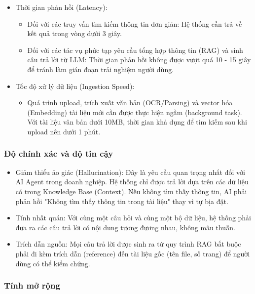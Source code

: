 \begin{itemize}
\item
  Thời gian phản hồi (Latency):

  \begin{itemize}
  \item
    Đối với các truy vấn tìm kiếm thông tin đơn giản: Hệ thống cần trả
    về kết quả trong vòng dưới 3 giây.
  \item
    Đối với các tác vụ phức tạp yêu cầu tổng hợp thông tin (RAG) và sinh
    câu trả lời từ LLM: Thời gian phản hồi không được vượt quá 10 - 15
    giây để tránh làm gián đoạn trải nghiệm người dùng.
  \end{itemize}
\item
  Tốc độ xử lý dữ liệu (Ingestion Speed):

  \begin{itemize}
  \item
    Quá trình upload, trích xuất văn bản (OCR/Parsing) và vector hóa
    (Embedding) tài liệu mới cần được thực hiện ngầm (background task).
    Với tài liệu văn bản dưới 10MB, thời gian khả dụng để tìm kiếm sau
    khi upload nên dưới 1 phút.
  \end{itemize}
\end{itemize}

\subsubsection{Độ chính xác và độ tin
cậy}\label{ux111ux1ed9-chuxednh-xuxe1c-vuxe0-ux111ux1ed9-tin-cux1eady}

\begin{itemize}
\item
  Giảm thiểu ảo giác (Hallucination): Đây là yêu cầu quan trọng nhất đối
  với AI Agent trong doanh nghiệp. Hệ thống chỉ được trả lời dựa trên
  các dữ liệu có trong Knowledge Base (Context). Nếu không tìm thấy
  thông tin, AI phải phản hồi "Không tìm thấy thông tin trong tài liệu"
  thay vì tự bịa đặt.
\item
  Tính nhất quán: Với cùng một câu hỏi và cùng một bộ dữ liệu, hệ thống
  phải đưa ra các câu trả lời có nội dung tương đương nhau, không mâu
  thuẫn.
\item
  Trích dẫn nguồn: Mọi câu trả lời được sinh ra từ quy trình RAG bắt
  buộc phải đi kèm trích dẫn (reference) đến tài liệu gốc (tên file, số
  trang) để người dùng có thể kiểm chứng.
\end{itemize}

\subsubsection{Tính mở rộng}\label{tuxednh-mux1edf-rux1ed9ng}

